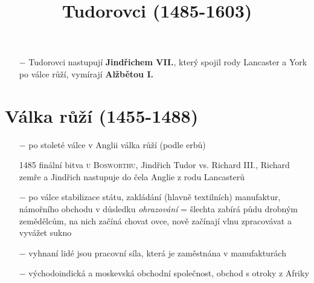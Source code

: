\documentclass{article}
\title{\vspace{-2cm}Tudorovci (1485-1603)\vspace{-1.7cm}}
\date{}
\author{}
\begin{document}
\maketitle

\begin{itemize}
    \vspace{-0.5em}
    \setlength\itemsep{0.15em}
    \item[$-$] Tudorovci nastupují \textbf{Jindřichem VII.}, který spojil rody Lancaster a York po válce růží, vymírají \textbf{Alžbětou I.}
\end{itemize}

\section*{Válka růží (1455-1488)}
\begin{itemize}
    \vspace{-0.5em}
    \setlength\itemsep{0.15em}
    \item[$-$] po stoleté válce v Anglii válka růží (podle erbů)
    \item[1485] finální bitva \textsc{u Bosworthu}, Jindřich Tudor vs. Richard III., Richard zemře a Jindřich nastupuje do čela Anglie z rodu Lancasterů
    \item[$-$] po válce stabilizace státu, zakládání (hlavně textilních) manufaktur, námořního obchodu v důsledku \textit{ohrazování} = šlechta zabírá půdu drobným zemědělcům, na nich začíná chovat ovce, nově začínají vlnu zpracovávat a vyvážet sukno
    \item[$-$] vyhnaní lidé jsou pracovní síla, která je zaměstnána v manufakturách
    \item[$-$] východoindická a moskevská obchodní společnost, obchod s otroky z Afriky
\end{itemize}
\end{document}
